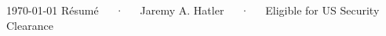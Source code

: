 \documentclass[11pt, letterpaper]{awesome-cv}
\begin{document}
\makecvheader[C]

\makecvfooter
  {\today}
  {Résumé~~~·~~~Jaremy A. Hatler~~~·~~~Eligible for US Security Clearance}
  {\thepage}








\end{document}

